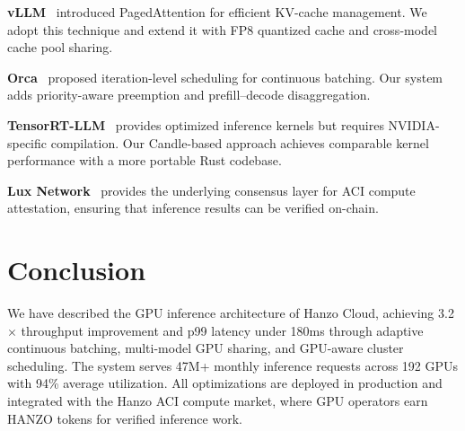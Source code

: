 \documentclass[11pt]{article}
\begin{document}
\textbf{vLLM}~\cite{vllm2023} introduced PagedAttention for efficient KV-cache
management. We adopt this technique and extend it with FP8 quantized cache and
cross-model cache pool sharing.

\textbf{Orca}~\cite{orca2022} proposed iteration-level scheduling for
continuous batching. Our system adds priority-aware preemption and
prefill--decode disaggregation.

\textbf{TensorRT-LLM}~\cite{tensorrt} provides optimized inference kernels but
requires NVIDIA-specific compilation. Our Candle-based approach achieves
comparable kernel performance with a more portable Rust codebase.

\textbf{Lux Network}~\cite{luxwhitepaper} provides the underlying consensus
layer for ACI compute attestation, ensuring that inference results can be
verified on-chain.

\section{Conclusion}
\label{sec:conclusion}

We have described the GPU inference architecture of Hanzo Cloud, achieving
3.2$\times$ throughput improvement and p99 latency under 180ms through adaptive
continuous batching, multi-model GPU sharing, and GPU-aware cluster scheduling.
The system serves 47M+ monthly inference requests across 192 GPUs with 94\%
average utilization. All optimizations are deployed in production and integrated
with the Hanzo ACI compute market, where GPU operators earn HANZO tokens for
verified inference work.
\end{document}
